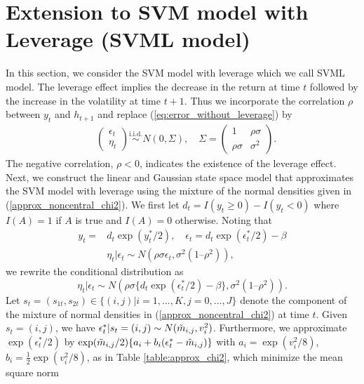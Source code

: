 \section{Extension to SVM model with Leverage (SVML model)}
\label{sec:approx_SVM_leverage}
In this section, we consider the SVM model with leverage which we call SVML model. The leverage effect implies the decrease in the return at time $t$  followed by the increase in the  volatility at time $t+1$. Thus we incorporate the correlation $\rho$ between $y_t$ and $h_{t+1}$ and replace (\ref{eq:error_without_leverage}) by
\begin{align} 
        &\begin{pmatrix}
            \epsilon_t \\
            \eta_t
        \end{pmatrix}
        \overset{\text{i.i.d.}}{\sim} N(0, \Sigma), \quad
        \Sigma = 
        \begin{pmatrix}
            1 & \rho \sigma \\
            \rho \sigma & \sigma^2
        \end{pmatrix}.  \label{eq:error_with_leverage}
\end{align}
The negative correlation, $\rho<0$, indicates the existence of the leverage effect. 
Next, we construct the linear and Gaussian state space model that approximates the SVM model with leverage using the mixture of the normal densities given in (\ref{approx_noncentral_chi2}).
We first let $d_t = I(y_t \geq 0) - I(y_t < 0)$ where $I(A) = 1$ if $A$ is true and $I(A) = 0$ otherwise.
Noting that
\begin{align*}
    y_t =& d_t \exp(y_t^*/2), \quad 
    \epsilon_t = d_t \exp(\epsilon_t^*/2) - \beta \\
    &\eta_t|\epsilon_t \sim N(\rho \sigma \epsilon_t, \sigma^2(1–\rho^2)),
\end{align*}
we rewrite the conditional distribution as
\begin{equation*}
    \eta_t|\epsilon_t \sim N\left(\rho \sigma \{ d_t \exp(\epsilon_t^*/2) - \beta \}, \sigma^2(1–\rho^2)\right).
\end{equation*}
Let $s_t = (s_{1t}, s_{2t}) \in \{ (i,j) | i=1,...,K, j=0,...,J \}$ denote the component of the mixture of normal densities in (\ref{approx_noncentral_chi2}) at time $t$.
Given $s_t = (i,j)$, we have $\epsilon_t^* | s_t=(i,j) \sim N(\Tilde{m}_{i,j}, v_i^2)$.
Furthermore, we approximate $\exp(\epsilon_t^*/2)$ by $\exp(\Tilde{m}_{i,j}/2) \{ a_i + b_i(\epsilon_t^* - \Tilde{m}_{i,j}) \}$ with $a_i = \exp(v_i^2/8)$, $b_i = \frac{1}{2} \exp(v_i^2/8)$, as in Table \ref{table:approx_chi2}, which minimize the mean square norm
